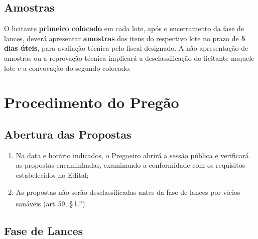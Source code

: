 \documentclass[12pt,a4paper]{article}
\newcommand{\art}[1]{art.\,#1}
\begin{document}
\subsection{Amostras}

O licitante \textbf{primeiro colocado} em cada lote, após o encerramento da fase de
lances, deverá apresentar \textbf{amostras} dos itens do respectivo lote no prazo
de \textbf{5 dias úteis}, para avaliação técnica pelo fiscal designado. A não
apresentação de amostras ou a reprovação técnica implicará a desclassificação do
licitante naquele lote e a convocação do segundo colocado.

\section{Procedimento do Pregão}

\subsection{Abertura das Propostas}

\begin{enumerate}
  \item Na data e horário indicados, o Pregoeiro abrirá a sessão pública e verificará
    as propostas encaminhadas, examinando a conformidade com os requisitos
    estabelecidos no Edital;

  \item As propostas não serão desclassificadas antes da fase de lances por vícios
    sanáveis (\art{59}, \S\,1.\textsuperscript{o}).
\end{enumerate}

\subsection{Fase de Lances}
\end{document}
